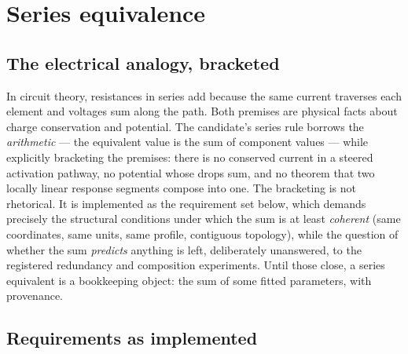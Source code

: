 \section{Series equivalence}\label{ch09:sec:series}

\subsection{The electrical analogy, bracketed}

In circuit theory, resistances in series add because the same current
traverses each element and voltages sum along the path. Both premises are
physical facts about charge conservation and potential. The candidate's
series rule borrows the \emph{arithmetic} --- the equivalent value is the
sum of component values --- while explicitly bracketing the premises: there
is no conserved current in a steered activation pathway, no potential
whose drops sum, and no theorem that two locally linear response segments
compose into one. The bracketing is not rhetorical. It is implemented as
the requirement set below, which demands precisely the structural
conditions under which the sum is at least \emph{coherent} (same
coordinates, same units, same profile, contiguous topology), while the
question of whether the sum \emph{predicts} anything is left, deliberately
unanswered, to the registered redundancy and composition experiments. Until
those close, a series equivalent is a bookkeeping object: the sum of some
fitted parameters, with provenance.

\subsection{Requirements as implemented}

